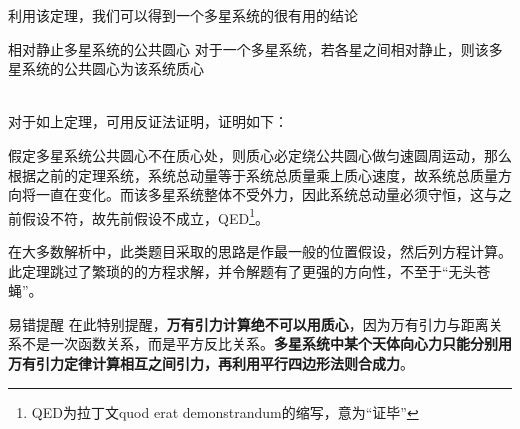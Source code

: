 利用该定理，我们可以得到一个多星系统的很有用的结论
~\\

\begin{minipage}[b]{0.3\linewidth}

\end{minipage}
\hfill
\begin{minipage}[b]{0.5\linewidth}
\begin{theo}{相对静止多星系统的公共圆心}{}
对于一个多星系统，若各星之间相对静止，则该多星系统的公共圆心为该系统质心
\end{theo}
\end{minipage}
~\\

对于如上定理，可用反证法证明，证明如下：

假定多星系统公共圆心不在质心处，则质心必定绕公共圆心做匀速圆周运动，那么根据之前的定理系统，系统总动量等于系统总质量乘上质心速度，故系统总质量方向将一直在变化。而该多星系统整体不受外力，因此系统总动量必须守恒，这与之前假设不符，故先前假设不成立，QED\footnote{QED为拉丁文quod erat demonstrandum的缩写，意为“证毕”}。

在大多数解析中，此类题目采取的思路是作最一般的位置假设，然后列方程计算。此定理跳过了繁琐的的方程求解，并令解题有了更强的方向性，不至于“无头苍蝇”。

\begin{mk}{易错提醒}{}
在此特别提醒，\textbf{万有引力计算绝不可以用质心}，因为万有引力与距离关系不是一次函数关系，而是平方反比关系。\textbf{多星系统中某个天体向心力只能分别用万有引力定律计算相互之间引力，再利用平行四边形法则合成力}。
\end{mk}

